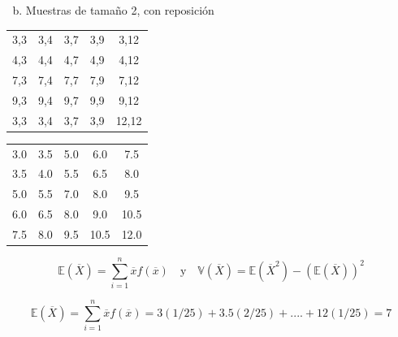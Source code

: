 \documentclass[
  ignorenonframetext,
]{beamer}
\providecommand{\tightlist}{%
  \setlength{\itemsep}{0pt}\setlength{\parskip}{0pt}}
\begin{document}
\begin{frame}{}

\begin{enumerate}
[a.]
\setcounter{enumi}{1}
\tightlist
\item
  Muestras de tamaño 2, con reposición
\end{enumerate}

\begin{multicols}{2}

\begin{center}
\begin{tabular}{ c c c c c}
 3,3 & 3,4 & 3,7 & 3,9 & 3,12\\ 
 4,3 & 4,4 & 4,7 & 4,9 & 4,12\\
 7,3 & 7,4 & 7,7 & 7,9 & 7,12\\
 9,3 & 9,4 & 9,7 & 9,9 & 9,12\\
 3,3 & 3,4 & 3,7 & 3,9 & 12,12
\end{tabular}
\end{center}

\columnbreak

\begin{center}
\begin{tabular}{ c c c c c}
  3.0 & 3.5 & 5.0 & 6.0 & 7.5\\ 
 3.5 & 4.0 & 5.5 & 6.5 & 8.0\\
 5.0 & 5.5 & 7.0 & 8.0 & 9.5\\ 
 6.0 & 6.5 & 8.0 & 9.0 & 10.5\\ 
7.5  & 8.0 &9.5& 10.5 &12.0
\end{tabular}
\end{center}
\end{multicols}

\[\mathbb{E}(\overline{X})=\sum_{i=1}^{n} \overline{x}f(\overline{x}) \quad\mbox{y} \quad \mathbb{V}(\overline{X})= \mathbb{E}(\overline{X}^2)-(\mathbb{E}(\overline{X}))^2\]

\[\mathbb{E}(\overline{X})=\sum_{i=1}^{n} \overline{x}f(\overline{x})=3(1/25)+3.5(2/25)+....+12(1/25)=7 \]

\end{frame}

\hypertarget{section-6}{%
\subsection{}\label{section-6}}
\end{document}
